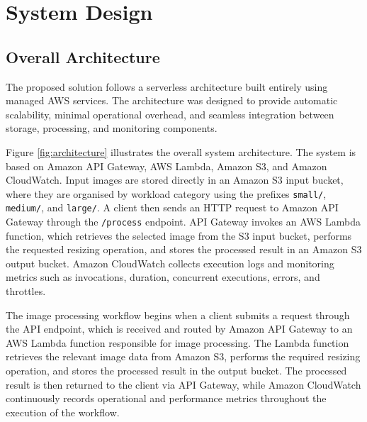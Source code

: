 \documentclass[11pt,a4paper,twocolumn]{article}
\begin{document}
\section{System Design}

\subsection{Overall Architecture}

The proposed solution follows a serverless architecture built entirely using managed AWS services. 
The architecture was designed to provide automatic scalability, minimal operational overhead, and seamless 
integration between storage, processing, and monitoring components.

Figure \ref{fig:architecture} illustrates the overall system architecture.
The system is based on Amazon API Gateway, AWS Lambda, Amazon S3, and Amazon CloudWatch. Input images are 
stored directly in an Amazon S3 input bucket, where they are organised by workload category using the 
prefixes \texttt{small/}, \texttt{medium/}, and \texttt{large/}. A client then sends an HTTP request to 
Amazon API Gateway through the \texttt{/process} endpoint. API Gateway invokes an AWS Lambda function, 
which retrieves the selected image from the S3 input bucket, performs the requested resizing operation, 
and stores the processed result in an Amazon S3 output bucket. Amazon CloudWatch collects execution logs 
and monitoring metrics such as invocations, duration, concurrent executions, errors, and throttles.

The image processing workflow begins when a client submits a request through the API endpoint, which is received and routed by Amazon API Gateway to an AWS Lambda function responsible for image processing. The Lambda function retrieves the relevant image data from Amazon S3, performs the required resizing operation, and stores the processed result in the output bucket. The processed result is then returned to the client via API Gateway, while Amazon CloudWatch continuously records operational and performance metrics throughout the execution of the workflow.
\end{document}
